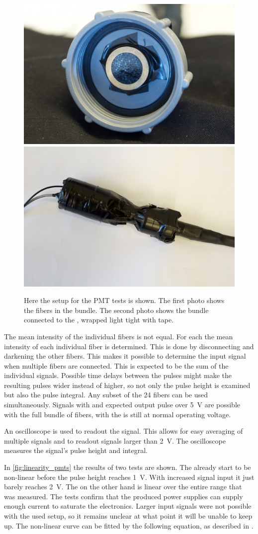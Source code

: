 \begin{figure}
    \centering
    \includegraphics[width=.45\linewidth]{plots/station/ARN_085351.jpg}
    \includegraphics[width=.45\linewidth]{plots/station/ARN_085349.jpg}
    \caption{Here the setup for the PMT tests is shown. The first photo shows the fibers in the bundle. The second photo shows the bundle connected to the \pmt, wrapped light tight with tape.}
    \label{fig:pmt_test_setup}
\end{figure}

The mean intensity of the individual fibers is not equal. For each \pmt the mean intensity of each individual fiber is determined. This is done by disconnecting and darkening the other fibers. This makes it possible to determine the input signal when multiple fibers are connected. This is expected to be the sum of the individual signals. Possible time delays between the pulses might make the resulting pulses wider instead of higher, so not only the pulse height is examined but also the pulse integral. Any subset of the 24 fibers can be used simultaneously. Signals with and expected \pmt output pulse over \SI{5}{\volt} are possible with the full bundle of fibers, with the \pmt is still at normal operating voltage.

An oscilloscope is used to readout the \pmt signal. This allows for easy averaging of multiple signals and to readout signals larger than \SI{2}{\volt}. The oscilloscope measures the signal's pulse height and integral.

In \cref{fig:linearity_pmts} the results of two \pmt tests are shown. The \senstech \pmt already start to be non-linear before the pulse height reaches \SI{1}{\volt}. With increased signal input it just barely reaches \SI{2}{\volt}. The \nikhef \pmt on the other hand is linear over the entire range that was measured. The tests confirm that the \nikhef produced \pmt power supplies can supply enough current to saturate the \hisparc electronics. Larger input signals were not possible with the used setup, so it remains unclear at what point it will be unable to keep up. The non-linear curve can be fitted by the following equation, as described in \cite{icecube2010pmt}.

